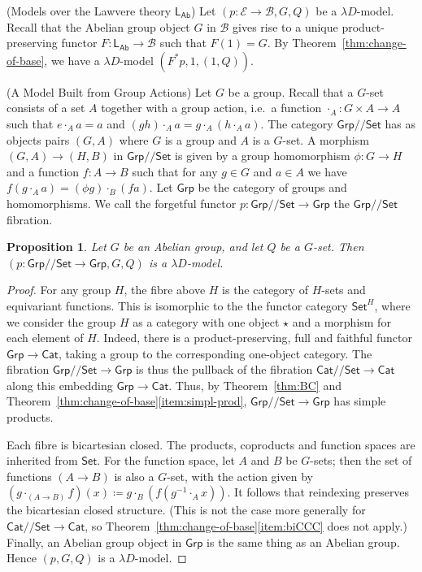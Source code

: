 \documentclass[a4paper,UKenglish]{lipics}
\theoremstyle{plain}
\newtheorem{proposition}[theorem]{Proposition}
\newcommand{\msf}[1]{\mathsf{#1}} %
\newcommand{\Grp}{\msf{Grp}}
\newcommand{\Set}{\msf{Set}}
\newcommand{\Cat}{\msf{Cat}}
\newcommand{\LAb}{\msf{L}_{\msf{Ab}}}
\newcommand{\B}{\mathcal{B}}
\newcommand{\E}{\mathcal{E}}
\newcommand{\Lslice}[1]{#1/\!/\Set}
\newcommand{\GrpSet}{\Lslice{\Grp}}
\newcommand{\CatSet}{\Lslice{\Cat}}
\begin{document}
\begin{example}(Models over the Lawvere theory $\LAb$)
\label{ex:Lawvere}
Let $(p:\E\to\B,G,Q)$ be a $\lambda D$-model.  Recall that the Abelian group object $G$ in $\B$ gives rise to a unique product-preserving functor $F:\LAb\to \B$ such that $F(1)=G$. By Theorem~\ref{thm:change-of-base}, we have a $\lambda D$-model $(F^\ast p,1,(1, Q))$.
\end{example}

\begin{example}(A Model Built from Group Actions)
\label{ex:GrpAct}
Let $G$ be a group. Recall that a $G$-set consists of a set $A$ together with a group action, i.e.\ a function $\cdot_A:G\times A\to A$ such that $e\cdot_{A} a=a$ and $(gh)\cdot_A a=g\cdot_A (h\cdot_A a)$. The category $\GrpSet$ has as objects pairs $(G,A)$ where $G$ is a group and $A$ is a $G$-set. A morphism $(G,A) \rightarrow (H,B)$ in $\GrpSet$ is given by a group homomorphism $\phi:G\rightarrow H$ and a function $f:A \rightarrow B$ such that for any $g\in G$ and $a\in A$ we have $f (g\cdot_A a) = (\phi g)\cdot_B (f a)$. Let $\Grp$ be the category of groups and homomorphisms. We call the forgetful functor $p : \GrpSet\to \Grp$ the $\GrpSet$ fibration.

\begin{proposition}
Let $G$ be an Abelian group, and let $Q$ be a $G$-set. Then $(p : \GrpSet \rightarrow \Grp,G,Q)$ is a $\lambda D$-model.
\end{proposition}
\begin{proof}
For any group $H$, the fibre above $H$ is the category of $H$-sets and equivariant functions.
This is isomorphic to the
the functor category ${\Set}^H$,
where we consider the group $H$ as a category with one object $\star$
and a morphism for each element of $H$.
Indeed, there is a product-preserving, full and faithful functor $\Grp\to\Cat$,
taking a group to the corresponding one-object category.
The fibration $\GrpSet\to\Grp$ is thus the pullback of
the fibration $\CatSet\to\Cat$ along this embedding $\Grp \to \Cat$.
Thus, by Theorem~\ref{thm:BC} and Theorem~\ref{thm:change-of-base}\eqref{item:simpl-prod},
$\GrpSet\to\Grp$ has simple products.

Each fibre is bicartesian closed.
The products, coproducts and function spaces are inherited from $\Set$.
For the function space, let $A$ and $B$ be $G$-sets;
then the set of functions $(A\to B)$ is also a $G$-set,
with the action given by $(g\cdot_{(A\to B)}f)(x)\coloneqq g\cdot_B(f(g^{-1}\cdot_A x))$.
It follows that reindexing preserves the bicartesian closed structure.
(This is not the case more generally for $\CatSet\to\Cat$, so Theorem~\ref{thm:change-of-base}\eqref{item:biCCC} does not apply.)
%
Finally, an Abelian group object in $\Grp$ is the same thing as an Abelian group. Hence $(p,G,Q)$ is a $\lambda D$-model.
\end{proof}


\end{example}
\end{document}
